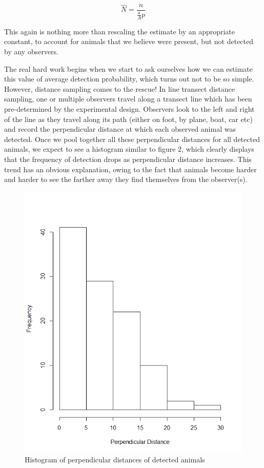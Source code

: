 \documentclass[11pt]{article}
\begin{document}
\begin{multicols}{2}
\begin{equation}
\hat{N}=\frac{n}{\frac{a}{A}p}
\end{equation} 


This again is nothing more than rescaling the estimate by an appropriate constant, to account for animals that we believe were present, but not detected by any observers. 


The real hard work begins when we start to ask ourselves how we can estimate this value of average detection probability, which turns out not to be so simple. However, distance sampling comes to the rescue!  In line transect distance sampling, one or multiple observers travel along a transect line which has been pre-determined by the experimental design. Observers look to the left and right of the line as they travel along its path (either on foot, by plane, boat, car etc) and record the perpendicular distance at which each observed animal was detected. Once we pool together all these perpendicular distances for all detected animals, we expect to see a histogram similar to figure 2, which clearly displays that the frequency of detection drops as perpendicular distance increases. This trend has an obvious explanation, owing to the fact that animals become harder and harder to see the farther away they find themselves from the observer(s).

\begin{figure}[H]
\includegraphics[scale=0.5]{DistanceHist}
\caption{Histogram of perpendicular distances of detected animals}
\end{figure}



\end{multicols}
\end{document}
